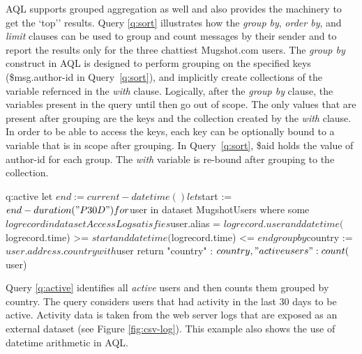 AQL supports grouped aggregation as well and also provides the machinery to get the `top'' results.
Query \ref{q:sort} illustrates how the \emph{group by}, \emph{order by}, and \emph{limit} clauses can be used to group and count messages by their sender and to report the results only for the three chattiest Mugshot.com users.
The \emph{group by} construct in AQL is designed to perform grouping on the specified keys (\$msg.author-id in Query~\ref{q:sort}), and implicitly create collections of the variable refernced in the \emph{with} clause. Logically, after the \emph{group by} clause, the variables present in the query until then go out of scope. The only values that are present after grouping are the keys and the collection created by the \emph{with} clause. In order to be able to access the keys, each key can be optionally bound to a variable that is in scope after grouping. In Query~\ref{q:sort}, \$aid holds the value of author-id for each group. The \emph{with} variable is re-bound after grouping to the collection.

\begin{query}{q:active}
let $end := current-datetime()
let $start := $end - duration("P30D")
for $user in dataset MugshotUsers
where some $logrecord in dataset AccessLog
  satisfies $user.alias = $logrecord.user
  and datetime($logrecord.time) >= $start 
  and datetime($logrecord.time) <= $end
group by $country := $user.address.country with $user
return {
  "country" : $country,
  "active users" : count($user)
}
\end{query}

Query \ref{q:active} identifies all \emph{active} users and then counts them grouped by country.
The query considers users that had activity in the last 30 days to be active.
Activity data is taken from the web server logs that are exposed as an external dataset (see Figure \ref{fig:csv-log}).
This example also shows the use of datetime arithmetic in AQL.


